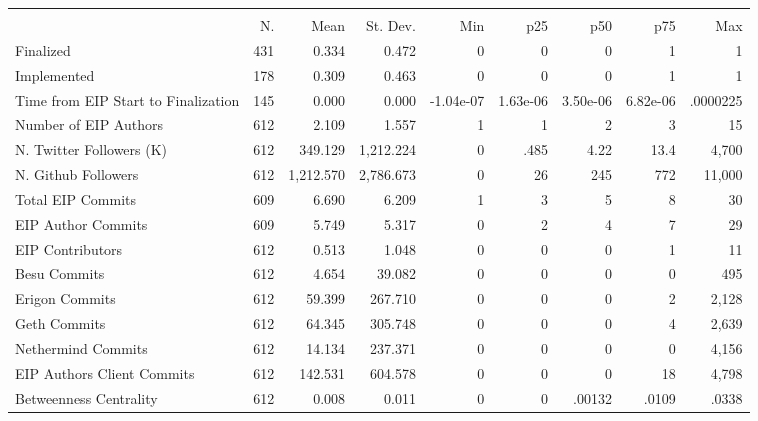 {
\def\sym#1{\ifmmode^{#1}\else\(^{#1}\)\fi}
\begin{tabular}{l*{1}{rrrrrrrr}}
\hline\hline
                    &\multicolumn{8}{c}{}                                                                                   \\
                    &          N.&        Mean&    St. Dev.&         Min&         p25&         p50&         p75&         Max\\
\hline
Finalized           &         431&       0.334&       0.472&           0&           0&           0&           1&           1\\
Implemented         &         178&       0.309&       0.463&           0&           0&           0&           1&           1\\
Time from EIP Start to Finalization&         145&       0.000&       0.000&   -1.04e-07&    1.63e-06&    3.50e-06&    6.82e-06&    .0000225\\
Number of EIP Authors&         612&       2.109&       1.557&           1&           1&           2&           3&          15\\
N. Twitter Followers (K)&         612&     349.129&   1,212.224&           0&        .485&        4.22&        13.4&       4,700\\
N. Github Followers &         612&   1,212.570&   2,786.673&           0&          26&         245&         772&      11,000\\
Total EIP Commits   &         609&       6.690&       6.209&           1&           3&           5&           8&          30\\
EIP Author Commits  &         609&       5.749&       5.317&           0&           2&           4&           7&          29\\
EIP Contributors    &         612&       0.513&       1.048&           0&           0&           0&           1&          11\\
Besu Commits        &         612&       4.654&      39.082&           0&           0&           0&           0&         495\\
Erigon Commits      &         612&      59.399&     267.710&           0&           0&           0&           2&       2,128\\
Geth Commits        &         612&      64.345&     305.748&           0&           0&           0&           4&       2,639\\
Nethermind Commits  &         612&      14.134&     237.371&           0&           0&           0&           0&       4,156\\
EIP Authors Client Commits&         612&     142.531&     604.578&           0&           0&           0&          18&       4,798\\
Betweenness Centrality&         612&       0.008&       0.011&           0&           0&      .00132&       .0109&       .0338\\
\hline\hline
\end{tabular}
}
